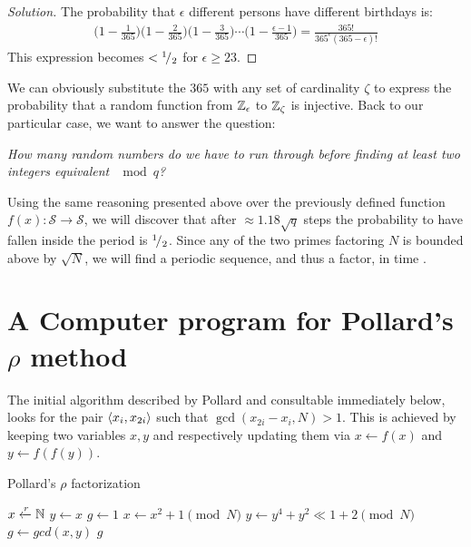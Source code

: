 \begin{proof}[Solution]
  The probability that $\epsilon$ different persons have different birthdays is:
  \begin{align*}
    \Big(1 - \frac{1}{365}\Big)
    \Big(1 - \frac{2}{365}\Big)
    \Big(1 - \frac{3}{365}\Big)
    \cdots
    \Big(1 - \frac{\epsilon -1}{365}\Big)
    =
    \frac{365!}{365^\epsilon (365-\epsilon)!}
  \end{align*}
  This expression becomes $< {}^{1}\!/_{2}$ for $\epsilon \geq 23$.
\end{proof}

We can obviously substitute the $365$ with any set of cardinality $\zeta$
to express the probability that a random function from $\mathbb{Z}_{\epsilon}$
to $\mathbb{Z}_{\zeta}$ is injective. Back to our particular case,
we want to answer the question:

\emph{
  How many random numbers do we have to run through before finding at least
  two integers equivalent $\mod{q}$?
}


Using the same reasoning presented above over the previously defined function
$f(x): \mathcal{S} \to \mathcal{S}$, we will discover that after
$\approx 1.18 \sqrt{q}$ steps the probability to have fallen inside the period
is ${}^{1}\!/_{2}$. %
Since any of the two primes factoring $N$ is bounded above by $\sqrt{N}$, we
will find a periodic sequence, and thus a factor, in time .


\section{A Computer program for Pollard's $\rho$ method}

The initial algorithm described by Pollard \cite{pollardMC} and consultable
immediately below, looks for the pair $\langle x_i, x_{2i}\rangle$ such that
$\gcd(x_{2i} - x_i, N) > 1$.  This is achieved by keeping two variables $x, y$
and respectively updating them via $x \gets f(x)$ and $y \gets f(f(y))$.

\begin{algorithm}
  \caption{Pollard's $\rho$ factorization}
  \begin{algorithmic}[1]
    \State $x \xleftarrow{r} \mathbb{N}$
    \State $y \gets x$
    \State $g \gets 1$
      \State $x \gets x^2 + 1 \pmod{N}$
      \State $y \gets y^4 + y^2 \ll 1 + 2 \pmod{N}$
      \State $g \gets gcd(x, y)$
    \EndWhile
    \Return $g$
  \end{algorithmic}
\end{algorithm}

